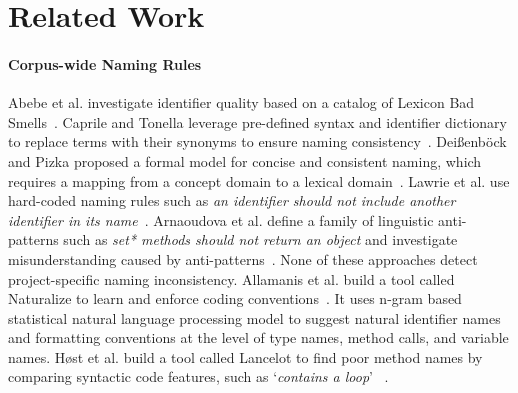 \section{Related Work}

\paragraph{Corpus-wide Naming Rules}  Abebe et al.\/ investigate identifier quality  based on a catalog of Lexicon Bad Smells~\cite{abebe:wcre12}. 
Caprile and Tonella leverage pre-defined syntax and identifier dictionary to replace terms with their synonyms to ensure naming consistency~\cite{caprile:reconstruct}. Dei{\ss}enb{\"{o}}ck and Pizka proposed a formal model for concise and consistent naming, which requires a mapping from a concept domain to a lexical domain~\cite{ccnames:Pizka06}. Lawrie et al.\/ use hard-coded naming rules such as \textit{an identifier should not include another identifier in its name}~\cite{syntacticcc:SCAM06}.  Arnaoudova et al.\/ define a family of linguistic anti-patterns such as \textit{set* methods should not return an object} and investigate misunderstanding caused by anti-patterns~\cite{antipattern:CSMR13}. None of these approaches detect project-specific naming inconsistency.  
Allamanis et al. \/ build a tool called Naturalize to learn and enforce coding conventions~\cite{birdfse14:convension}. It uses n-gram based statistical natural language processing model to suggest natural identifier names and formatting conventions at the level of type names, method calls, and variable names. 
H{\o}st et al. \/ build a tool called Lancelot to find poor method names by comparing syntactic code features, such as `\textit{contains a loop}'~\cite{nameBug:ECOOP09} .  
